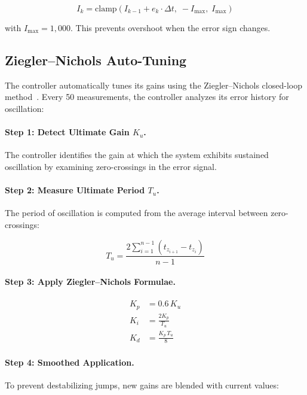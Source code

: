 \documentclass[11pt,a4paper]{article}
\begin{document}
\begin{equation}
I_k = \text{clamp}\!\left(I_{k-1} + e_k \cdot \Delta t,\; -I_{\max},\; I_{\max}\right)
\label{eq:antiwindup}
\end{equation}

with $I_{\max} = 1{,}000$. This prevents overshoot when the error sign changes.

\subsection{Ziegler--Nichols Auto-Tuning}

The controller automatically tunes its gains using the Ziegler--Nichols closed-loop method~\cite{zieglernichols}. Every 50 measurements, the controller analyzes its error history for oscillation:

\paragraph{Step 1: Detect Ultimate Gain $K_u$.} The controller identifies the gain at which the system exhibits sustained oscillation by examining zero-crossings in the error signal.

\paragraph{Step 2: Measure Ultimate Period $T_u$.} The period of oscillation is computed from the average interval between zero-crossings:

\begin{equation}
T_u = \frac{2 \sum_{i=1}^{n-1} (t_{z_{i+1}} - t_{z_i})}{n - 1}
\label{eq:ultimate_period}
\end{equation}

\paragraph{Step 3: Apply Ziegler--Nichols Formulae.}

\begin{align}
K_p &= 0.6 \, K_u \label{eq:zn_kp} \\
K_i &= \frac{2 K_p}{T_u} \label{eq:zn_ki} \\
K_d &= \frac{K_p \, T_u}{8} \label{eq:zn_kd}
\end{align}

\paragraph{Step 4: Smoothed Application.} To prevent destabilizing jumps, new gains are blended with current values:
\end{document}
